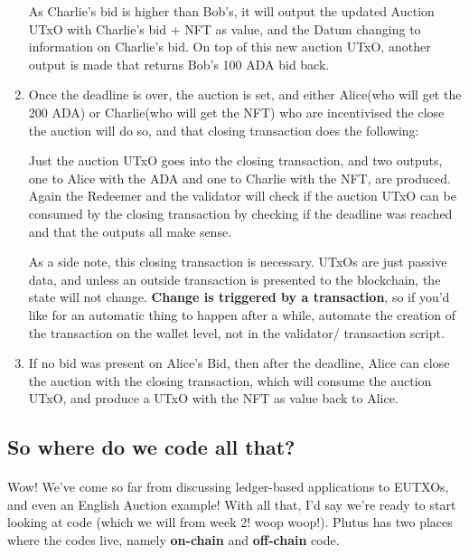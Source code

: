 \documentclass[a4paper, 11pt]{article}
\begin{document}
\begin{enumerate}
        As Charlie's bid is higher than Bob's, it will output the updated Auction UTxO with Charlie's bid + NFT as value, and the Datum changing to information on Charlie's bid. On top of this new auction UTxO, another output is made that returns Bob's 100 ADA bid back.
        
        \item Once the deadline is over, the auction is set, and either Alice(who will get the 200 ADA) or Charlie(who will get the NFT) who are incentivised the close the auction will do so, and that closing transaction does the following:
        
        Just the auction UTxO goes into the closing transaction, and two outputs, one to Alice with the ADA and one to Charlie with the NFT, are produced. Again the Redeemer and the validator will check if the auction UTxO can be consumed by the closing transaction by checking if the deadline was reached and that the outputs all make sense.

        As a side note, this closing transaction is necessary. UTxOs are just passive data, and unless an outside transaction is presented to the blockchain, the state will not change. \textbf{Change is triggered by a transaction}, so if you'd like for an automatic thing to happen after a while, automate the creation of the transaction on the wallet level, not in the validator/ transaction script.

        \item If no bid was present on Alice's Bid, then after the deadline, Alice can close the auction with the closing transaction, which will consume the auction UTxO, and produce a UTxO with the NFT as value back to Alice.
        \end{enumerate}


    \subsection{So where do we code all that?}

    \paragraph{} Wow! We've come so far from discussing ledger-based applications to EUTXOs, and even an English Auction example! With all that, I'd say we're ready to start looking at code (which we will from week 2! woop woop!).  Plutus has two places where the codes live, namely \textbf{on-chain} and \textbf{off-chain} code.
\end{document}
